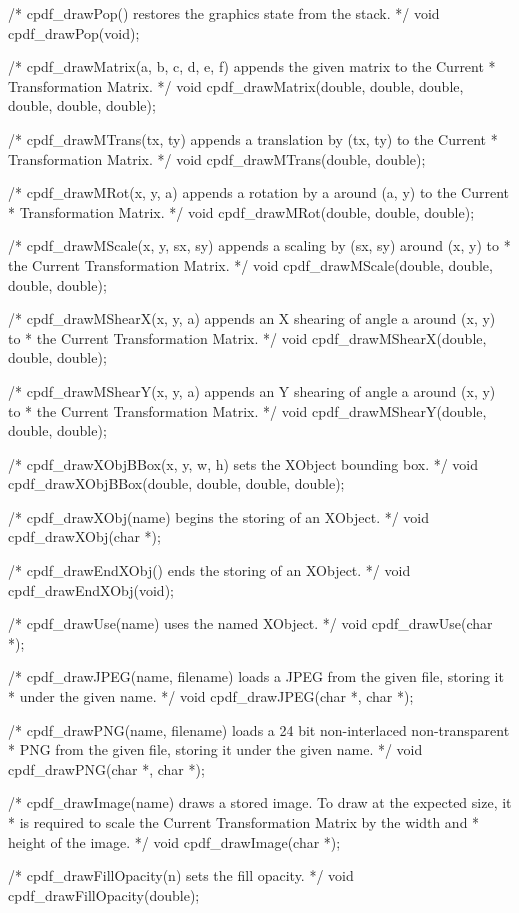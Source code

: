 /* cpdf_drawPop() restores the graphics state from the stack. */
void cpdf_drawPop(void);

/* cpdf_drawMatrix(a, b, c, d, e, f) appends the given matrix to the Current
 * Transformation Matrix. */
void cpdf_drawMatrix(double, double, double, double, double, double);

/* cpdf_drawMTrans(tx, ty) appends a translation by (tx, ty) to the Current
 * Transformation Matrix. */
void cpdf_drawMTrans(double, double);

/* cpdf_drawMRot(x, y, a) appends a rotation by a around (a, y) to the Current
 * Transformation Matrix. */
void cpdf_drawMRot(double, double, double);

/* cpdf_drawMScale(x, y, sx, sy) appends a scaling by (sx, sy) around (x, y) to
 * the Current Transformation Matrix. */
void cpdf_drawMScale(double, double, double, double);

/* cpdf_drawMShearX(x, y, a) appends an X shearing of angle a around (x, y) to
 * the Current Transformation Matrix. */
void cpdf_drawMShearX(double, double, double);

/* cpdf_drawMShearY(x, y, a) appends an Y shearing of angle a around (x, y) to
 * the Current Transformation Matrix. */
void cpdf_drawMShearY(double, double, double);

/* cpdf_drawXObjBBox(x, y, w, h) sets the XObject bounding box. */
void cpdf_drawXObjBBox(double, double, double, double);

/* cpdf_drawXObj(name) begins the storing of an XObject. */
void cpdf_drawXObj(char *);

/* cpdf_drawEndXObj() ends the storing of an XObject. */
void cpdf_drawEndXObj(void);

/* cpdf_drawUse(name) uses the named XObject. */
void cpdf_drawUse(char *);

/* cpdf_drawJPEG(name, filename) loads a JPEG from the given file, storing it
 * under the given name. */
void cpdf_drawJPEG(char *, char *);

/* cpdf_drawPNG(name, filename) loads a 24 bit non-interlaced non-transparent
 * PNG from the given file, storing it under the given name. */
void cpdf_drawPNG(char *, char *);

/* cpdf_drawImage(name) draws a stored image. To draw at the expected size, it
 * is required to scale the Current Transformation Matrix by the width and
 * height of the image. */
void cpdf_drawImage(char *);

/* cpdf_drawFillOpacity(n) sets the fill opacity. */
void cpdf_drawFillOpacity(double);


